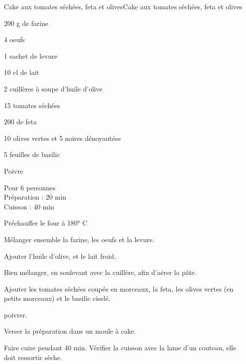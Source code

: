 \begin{recette}{Cake aux tomates séchées, feta et olives}{Cake aux tomates séchées, feta et olives}

\begin{ingredients}
200 g de farine\par
4 oeufs\par
1 sachet de levure\par
10 cl de lait\par
2 cuillères à soupe d'huile d'olive\par
15 tomates séchées\par
200 de feta\par
10 olives vertes et 5 noires dénoyautées\par
5 feuilles de basilic\par
Poivre\par
\end{ingredients}

\begin{infos}
Pour 6 personnes\\
Préparation : 20 min\\
Cuisson : 40 min\\
\end{infos}

\begin{etapes}
\item Préchauffer le four à 180° C
\item Mélanger ensemble la farine, les oeufs et la levure.
\item Ajouter l'huile d'olive, et le lait froid.
\item Bien mélanger, en soulevant avec la cuillère, afin d'aérer la pâte.
\item Ajouter les tomates séchées coupée en morceaux, la feta, les olives vertes (en petits morceaux) et le basilic ciselé.
\item poivrer.
\item Verser la préparation dans un moule à cake.
\item Faire cuire pendant 40 min. Vérifier la cuisson avec la lame d'un couteau, elle doit ressortir sèche.
\end{etapes}

\end{recette}